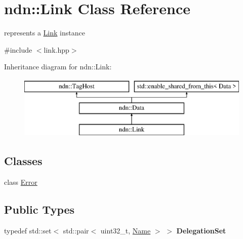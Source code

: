 \hypertarget{classndn_1_1Link}{}\section{ndn\+:\+:Link Class Reference}
\label{classndn_1_1Link}


represents a \hyperlink{classndn_1_1Link}{Link} instance  




{\ttfamily \#include $<$link.\+hpp$>$}

Inheritance diagram for ndn\+:\+:Link\+:\begin{figure}[H]
\begin{center}
\leavevmode
\includegraphics[height=3.000000cm]{classndn_1_1Link}
\end{center}
\end{figure}
\subsection*{Classes}
\begin{DoxyCompactItemize}
\item 
class \hyperlink{classndn_1_1Link_1_1Error}{Error}
\end{DoxyCompactItemize}
\subsection*{Public Types}
\begin{DoxyCompactItemize}
\item 
typedef std\+::set$<$ std\+::pair$<$ uint32\+\_\+t, \hyperlink{classndn_1_1Name}{Name} $>$ $>$ {\bfseries Delegation\+Set}\hypertarget{classndn_1_1Link_a7c39b61dc2fd7f7fa95724d0bfdc4dca}{}\label{classndn_1_1Link_a7c39b61dc2fd7f7fa95724d0bfdc4dca}

\end{DoxyCompactItemize}
